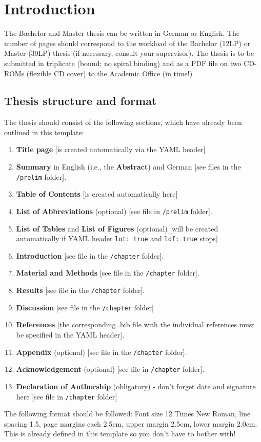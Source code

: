 \documentclass[a4paper,12pt]{article}
\providecommand{\tightlist}{%
  \setlength{\itemsep}{0pt}\setlength{\parskip}{0pt}}
\begin{document}
\hypertarget{introduction}{%
\section{Introduction}\label{introduction}}

The Bachelor and Master thesis can be written in German or English. The number of pages should correspond to the workload of the Bachelor (12LP) or Master (30LP) thesis (if necessary, consult your supervisor). The thesis is to be submitted in triplicate (bound; no spiral binding) and as a PDF file on two CD-ROMs (flexible CD cover) to the Academic Office (in time!)

\hypertarget{thesis-structure-and-format}{%
\subsection{Thesis structure and format}\label{thesis-structure-and-format}}

The thesis should consist of the following sections, which have already been outlined in this template:
\begin{enumerate}
\def\labelenumi{\arabic{enumi}.}
\tightlist
\item
  \textbf{Title page} {[}is created automatically via the YAML header{]}
\item
  \textbf{Summary} in English (i.e., the \textbf{Abstract}) and German {[}see files in the \texttt{/prelim} folder{]}.
\item
  \textbf{Table of Contents} {[}is created automatically here{]}
\item
  \textbf{List of Abbreviations} (optional) {[}see file in \texttt{/prelim} folder{]}.
\item
  \textbf{List of Tables} and \textbf{List of Figures} (optional) {[}will be created automatically if YAML header \texttt{lot:\ true} and \texttt{lof:\ true} stops{]}
\item
  \textbf{Introduction} {[}see file in the \texttt{/chapter} folder{]}.
\item
  \textbf{Material and Methods} {[}see file in the \texttt{/chapter} folder{]}.
\item
  \textbf{Results} {[}see file in the \texttt{/chapter} folder{]}.
\item
  \textbf{Discussion} {[}see file in the \texttt{/chapter} folder{]}
\item
  \textbf{References} {[}the corresponding .bib file with the individual references must be specified in the YAML header{]}.
\item
  \textbf{Appendix} (optional) {[}see file in the \texttt{/chapter} folder{]}.
\item
  \textbf{Acknowledgement} (optional) {[}see file in \texttt{/chapter} folder{]}.
\item
  \textbf{Declaration of Authorship} (obligatory) - don't forget date and signature here {[}see file in \texttt{/chapter} folder{]}
\end{enumerate}
The following format should be followed: Font size 12 Times New Roman, line spacing 1.5, page margins each 2.5cm, upper margin 2.5cm, lower margin 2.0cm. This is already defined in this template so you don't have to bother with!
\end{document}
